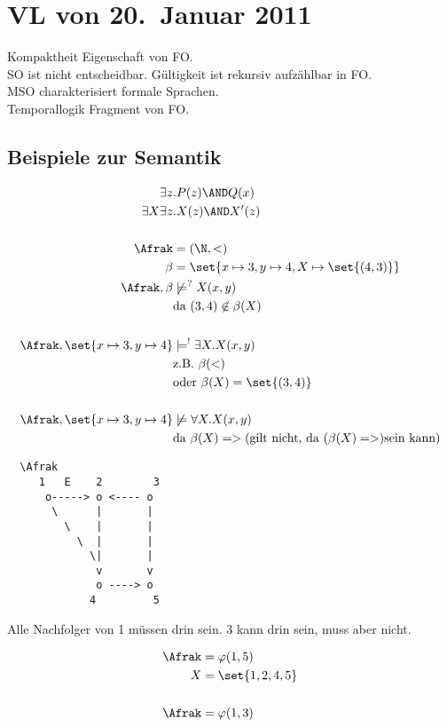 \section{VL von 20.~Januar 2011}

Kompaktheit Eigenschaft von FO.\\
SO ist nicht entscheidbar. Gültigkeit ist rekursiv aufzählbar in FO.\\
MSO charakterisiert formale Sprachen.\\
Temporallogik Fragment von FO.\\

\subsection{Beispiele zur Semantik}

\begin{align*}
  \exists z&.P(z) \AND Q(x) \\
  \exists X\exists z&.X(z) \AND X'(z) \\[\baselineskip]
  \Afrak &= (\N, <) \\
  \beta &= \set{x\mapsto 3,y\mapsto 4, X\mapsto\set{(4,3)}} \\
  \Afrak, \beta & \not\models^? X(x,y) \\
    &\text{da}\ (3,4) \not\in \beta(X) \\[\baselineskip]
  \Afrak, \set{x\mapsto 3,y\mapsto 4} &\models^! \exists X.X(x,y)\\
    &\text{z.B.}\ \beta(<) \\
    &\text{oder}\ \beta(X) = \set{(3,4)} \\[\baselineskip]
  \Afrak, \set{x\mapsto 3,y\mapsto 4} &\not\models \forall X.X(x,y) \\
    &\text{da}\ \beta(X) = > (\text{gilt nicht, da }(\beta(X) = >) \text{sein kann})
\end{align*}

\begin{verbatim}
  \Afrak
     1   E    2        3
      o-----> o <---- o
       \      |       |
         \    |       |
           \  |       |
             \|       |
              v       v
              o ----> o
             4         5
\end{verbatim}

Alle Nachfolger von 1 müssen drin sein. 3 kann drin sein, muss aber nicht.

\begin{align*}
  \Afrak &= \varphi(1,5)\\
  X &= \set{1,2,4,5} \\[\baselineskip]
  \Afrak &= \varphi(1,3)
\end{align*}

